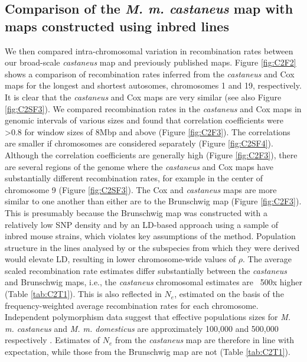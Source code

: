 \linespread{1}

\linespread{2}

\subsection{Comparison of the \textit{M. m. castaneus} map with maps constructed using inbred lines}
 
        	We then compared intra-chromosomal variation in recombination rates between our broad-scale \textit{castaneus} map and previously published maps. Figure \ref{fig:C2F2} shows a comparison of recombination rates inferred from the \textit{castaneus} and Cox maps for the longest and shortest autosomes, chromosomes 1 and 19, respectively. It is clear that the \textit{castaneus} and Cox maps are very similar (see also Figure \ref{fig:C2SF3}). We compared recombination rates in the \textit{castaneus} and Cox maps in genomic intervals of various sizes and found that correlation coefficients were >0.8 for window sizes of 8Mbp and above (Figure \ref{fig:C2F3}). The correlations are smaller if chromosomes are considered separately (Figure \ref{fig:C2SF4}). Although the correlation coefficients are generally high (Figure \ref{fig:C2F3}), there are several regions of the genome where the \textit{castaneus} and Cox maps have substantially different recombination rates, for example in the center of chromosome 9 (Figure \ref{fig:C2SF3}). The Cox and \textit{castaneus} maps are more similar to one another than either are to the Brunschwig map (Figure \ref{fig:C2F3}). This is presumably because the Brunschwig map was constructed with a relatively low SNP density and by an LD-based approach using a sample of inbred mouse strains, which violates key assumptions of the method. Population structure in the lines analysed by \cite{RN156} or the subspecies from which they were derived would elevate LD, resulting in lower chromosome-wide values of $\rho$. The average scaled recombination rate estimates differ substantially between the \textit{castaneus} and Brunschwig maps, i.e., the \textit{castaneus} chromosomal estimates are ~500x higher (Table \ref{tab:C2T1}). This is also reflected in $N_e$, estimated on the basis of the frequency-weighted average recombination rates for each chromosome. Independent polymorphism data suggest that effective populations sizes for \textit{M. m. castaneus} and \textit{M. m. domesticus} are approximately 100,000 and 500,000 respectively \citep{RN255,RN315}. Estimates of $N_e$ from the \textit{castaneus} map are therefore in line with expectation, while those from the Brunschwig map are not (Table \ref{tab:C2T1}).


